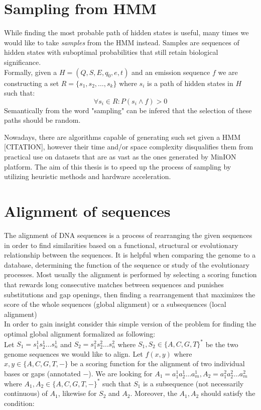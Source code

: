 \section{Sampling from HMM}
While finding the most probable path of hidden states is useful, many times we would like to take \emph{samples} from the HMM instead. Samples are sequences of hidden states with suboptimal probabilities that still retain biological significance.\\
Formally, given a $H = (Q,S,E,q_0,e,t)$ and an emission sequence $f$ we are constructing a set $R = \{s_1, s_2, \dots, s_k\}$ where $s_i$ is a path of hidden states in $H$ such that:
$$\forall s_i \in R: P(s_i \land f) > 0$$
Semantically from the word "sampling" can be infered that the selection of these paths should be random.

Nowadays, there are algorithms capable of generating such set given a HMM [CITATION], however their time and/or space complexity disqualifies them from practical use on datasets that are as vast as the ones generated by MinION platform.
The aim of this thesis is to speed up the process of sampling by utilizing heuristic methods and hardware acceleration.

\section{Alignment of sequences}

The alignment of DNA sequences is a process of rearranging the given sequences in order to find similarities based on a functional, structural or evolutionary relationship between the sequences. It is helpful when comparing the genome to a database, determining the function of the sequence or study of the evolutionary processes.
Most usually the alignment is performed by selecting a scoring function that rewards long consecutive matches between sequences and punishes substitutions and gap openings, then finding a rearrangement that maximizes the score of the whole sequences (global alignment) or a subsequences (local alignment)\\

In order to gain insight consider this simple version of the problem for finding the optimal global alignment formalized as following:\\
Let $S_1 = s_1^1s_2^1\dots s_n^1$ and $S_2 = s_1^2s_2^2 \dots s_n^2$ where $S_1, S_2 \in \{A,C,G,T\}^*$ be the two genome sequences we would like to align. Let $f(x,y)$ where $x,y \in \{A,C,G,T,-\}$ be a scoring function for the alignment of two individual bases or gaps (annotated $-$). We are looking for $A_1 = a_1^1a_2^1 \dots a_m^1, A_2  = a_1^2a_2^2 \dots a_m^2$ where $A_1, A_2\in \{A,C,G,T,-\}^*$ such that $S_1$ is a subsequence (not necessarily continuous) of $A_1$, likewise for $S_2$ and $A_2$.
Moreover, the $A_1, A_2$ should satisfy the condition:

